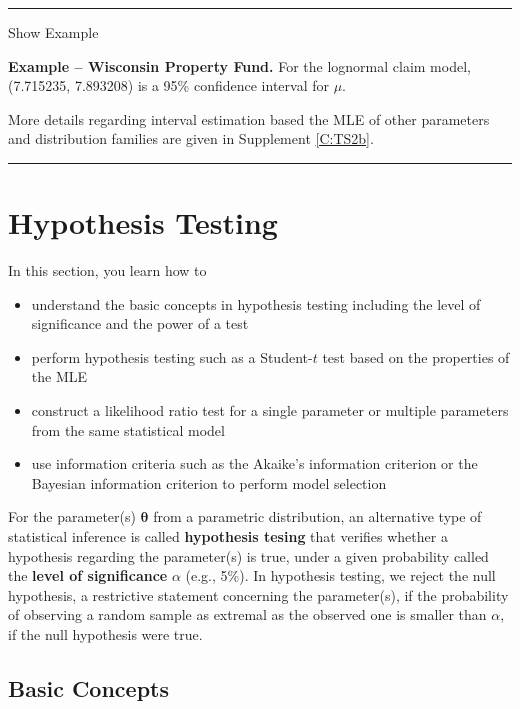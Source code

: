 \documentclass[]{book}
\providecommand{\tightlist}{%
  \setlength{\itemsep}{0pt}\setlength{\parskip}{0pt}}
\theoremstyle{definition}
\theoremstyle{definition}
\theoremstyle{definition}
\theoremstyle{remark}
\begin{document}
\begin{center}\rule{0.5\linewidth}{\linethickness}\end{center}

Show Example

\hypertarget{EXM:S1:CI}{}
\textbf{Example -- Wisconsin Property Fund.} For the lognormal claim
model, (7.715235, 7.893208) is a 95\% confidence interval for \(\mu\).

More details regarding interval estimation based the MLE of other
parameters and distribution families are given in Supplement
\ref{C:TS2b}.

\begin{center}\rule{0.5\linewidth}{\linethickness}\end{center}

\section{Hypothesis Testing}\label{S:TS1:HT}

In this section, you learn how to

\begin{itemize}
\tightlist
\item
  understand the basic concepts in hypothesis testing including the
  level of significance and the power of a test
\item
  perform hypothesis testing such as a Student-\(t\) test based on the
  properties of the MLE
\item
  construct a likelihood ratio test for a single parameter or multiple
  parameters from the same statistical model
\item
  use information criteria such as the Akaike's information criterion or
  the Bayesian information criterion to perform model selection
\end{itemize}

For the parameter(s) \(\boldsymbol{\theta}\) from a parametric
distribution, an alternative type of statistical inference is called
\textbf{hypothesis tesing} that verifies whether a hypothesis regarding
the parameter(s) is true, under a given probability called the
\textbf{level of significance} \(\alpha\) (e.g., 5\%). In hypothesis
testing, we reject the null hypothesis, a restrictive statement
concerning the parameter(s), if the probability of observing a random
sample as extremal as the observed one is smaller than \(\alpha\), if
the null hypothesis were true.

\subsection{Basic Concepts}\label{basic-concepts}
\end{document}
